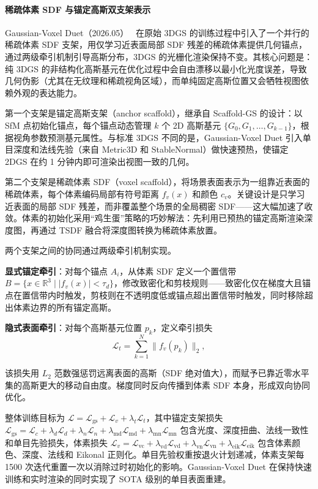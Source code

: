 \paragraph{稀疏体素 SDF 与锚定高斯双支架表示}

Gaussian-Voxel Duet（2026.05）~\cite{2605_26616} 在原始 3DGS 的训练过程中引入了一个并行的稀疏体素 SDF 支架，用仅学习近表面局部 SDF 残差的稀疏体素提供几何锚点，通过两级牵引机制引导高斯分布，3DGS 的光栅化渲染保持不变。其核心问题是：纯 3DGS 的非结构化高斯基元在优化过程中会自由漂移以最小化光度误差，导致几何伪影（尤其在无纹理和稀疏视角区域），而单纯固定高斯位置又会牺牲视图依赖外观的表达能力。

第一个支架是锚定高斯支架（anchor scaffold），继承自 Scaffold-GS 的设计：以 SfM 点初始化锚点，每个锚点动态管理 $k$ 个 2D 高斯基元 $\{G_0, G_1, \ldots, G_{k-1}\}$，根据视角参数预测基元属性。与标准 3DGS 不同的是，Gaussian-Voxel Duet 引入单目深度和法线先验（来自 Metric3D 和 StableNormal）做快速预热，使锚定 2DGS 在约 1 分钟内即可渲染出视图一致的几何。

第二个支架是稀疏体素 SDF（voxel scaffold），将场景表面表示为一组靠近表面的稀疏体素，每个体素编码局部有符号距离 $f_v(x)$ 和颜色 $c_v$。关键设计是只学习近表面的局部 SDF 残差，而非覆盖整个场景的全局稠密 SDF——这大幅加速了收敛。体素的初始化采用“鸡生蛋”策略的巧妙解法：先利用已预热的锚定高斯渲染深度图，再通过 TSDF 融合将深度图转换为稀疏体素放置。

两个支架之间的协同通过两级牵引机制实现。

\textbf{显式锚定牵引}：对每个锚点 $A_i$，从体素 SDF 定义一个置信带 $B=\{x \in \mathbb{R}^3 \mid |f_v(x)| < \tau_d\}$，修改致密化和剪枝规则——致密化仅在梯度大且锚点在置信带内时触发，剪枝则在不透明度低或锚点超出置信带时触发，同时移除超出体素边界的所有锚定高斯。

\textbf{隐式表面牵引}：对每个高斯基元位置 $p_k$，定义牵引损失
\begin{equation}
  \mathcal{L}_t = \sum_{k=1}^N \|f_v(p_k)\|_2,
\end{equation}

该损失用 $L_2$ 范数强惩罚远离表面的高斯（SDF 绝对值大），而赋予已靠近零水平集的高斯更大的移动自由度。梯度同时反向传播到体素 SDF 本身，形成双向协同优化。

整体训练目标为 $\mathcal{L}=\mathcal{L}_\text{gs}+\mathcal{L}_v+\lambda_t\mathcal{L}_t$，其中锚定支架损失 $\mathcal{L}_\text{gs}=\mathcal{L}_c+\lambda_d\mathcal{L}_d+\lambda_n\mathcal{L}_n+\lambda_\text{md}\mathcal{L}_\text{md}+\lambda_\text{mn}\mathcal{L}_\text{mn}$ 包含光度、深度扭曲、法线一致性和单目先验损失，体素损失 $\mathcal{L}_v=\mathcal{L}_\text{vc}+\lambda_\text{vd}\mathcal{L}_\text{vd}+\lambda_\text{vn}\mathcal{L}_\text{vn}+\lambda_\text{eik}\mathcal{L}_\text{eik}$ 包含体素颜色、深度、法线和 Eikonal 正则化。单目先验权重按退火计划递减，体素支架每 1500 次迭代重置一次以消除过时初始化的影响。Gaussian-Voxel Duet 在保持快速训练和实时渲染的同时实现了 SOTA 级别的单目表面重建。


